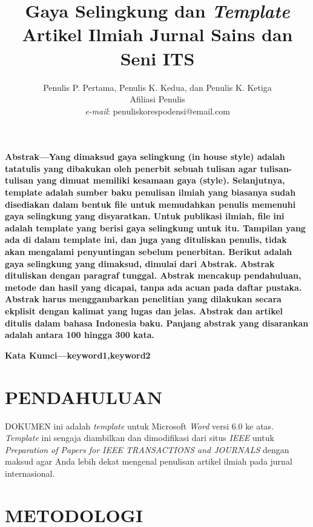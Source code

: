 \documentclass[12pt,a4paper]{article}
\title{\fontsize{24pt}{28pt}\selectfont Gaya Selingkung dan \textit{Template} Artikel Ilmiah Jurnal Sains dan Seni ITS}
\author{
  \vspace{-3pt}\fontsize{11pt}{13pt}\selectfont Penulis P. Pertama, Penulis K. Kedua, dan Penulis K. Ketiga\\
    \vspace{-3pt}\fontsize{11pt}{13pt}\selectfont Afiliasi Penulis\\
    \fontsize{11pt}{13pt}\selectfont\textit{e-mail}: penuliskorespodensi@email.com
}
\date{}
\newcommand{\smallcaps}[1]{\textsc{#1}}
\begin{document}
\maketitle
\thispagestyle{fancy}

\begin{multicols}{2}
\textbf{Abstrak—Yang dimaksud gaya selingkung (in house style) adalah tatatulis yang dibakukan oleh penerbit sebuah tulisan agar tulisan-tulisan yang dimuat memiliki kesamaan gaya (style). Selanjutnya, template adalah sumber baku penulisan ilmiah yang biasanya sudah disediakan dalam bentuk file untuk memudahkan penulis memenuhi gaya selingkung yang disyaratkan. Untuk publikasi ilmiah, file ini adalah template yang berisi gaya selingkung untuk itu. Tampilan yang ada di dalam template ini, dan juga yang dituliskan penulis, tidak akan mengalami penyuntingan sebelum penerbitan. Berikut adalah gaya selingkung yang dimaksud, dimulai dari Abstrak. Abstrak dituliskan dengan paragraf tunggal. Abstrak mencakup pendahuluan, metode dan hasil yang dicapai, tanpa ada acuan pada daftar pustaka. Abstrak harus menggambarkan penelitian yang dilakukan secara ekplisit dengan kalimat yang lugas dan jelas. Abstrak dan artikel ditulis dalam bahasa Indonesia baku.  Panjang abstrak yang disarankan adalah antara 100 hingga 300 kata.}\par\vspace{0.5\baselineskip}
\textbf{Kata Kumci—keyword1,keyword2}
\section{PENDAHULUAN}
\lettrine[lines=2, lraise=-0, nindent=0pt, findent=-1pt]
{\fontsize{28pt}{28pt}\selectfont D}{}\smallcaps{OKUMEN} ini adalah \textit{template} untuk Microsoft \textit{Word} versi 6.0 ke atas. \textit{Template} ini sengaja diambilkan dan dimodifikasi dari situs \textit{IEEE} untuk \textit{Preparation of Papers for IEEE TRANSACTIONS and JOURNALS} dengan maksud agar Anda lebih dekat mengenal penulisan artikel ilmiah pada jurnal internasional.
\section{METODOLOGI}
\lipsum

\end{multicols}
\end{document}
